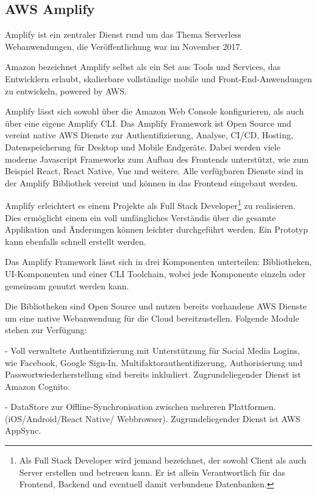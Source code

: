 
\subsection{AWS Amplify}

Amplify ist ein zentraler Dienst rund um das Thema Serverless Webanwendungen, die Veröffentlichung war im November 2017.

Amazon bezeichnet Amplify selbst als {}\glqq ein Set aus Tools und Services, das Entwicklern erlaubt, skalierbare vollständige
mobile und Front-End-Anwendungen zu entwickeln, powered by AWS.\grqq{}\cite[]{AWSAmplify}

Amplify lässt sich sowohl über die Amazon Web Console konfigurieren, als auch über eine eigene Amplify CLI.
Das Amplify Framework ist Open Source und vereint native AWS Dienste zur Authentifizierung, Analyse, CI/CD, Hosting, Datenspeicherung für Desktop und Mobile
Endgeräte. Dabei werden viele moderne Javascript Frameworks zum Aufbau des Frontends unterstützt, wie zum Beispiel React, React Native, Vue und weitere.
Alle verfügbaren Dienste sind in der Amplify Bibliothek vereint und können in das Frontend eingebaut werden.

Amplify erleichtert es einem Projekte als Full Stack Developer\footnote{Als Full Stack Developer wird jemand bezeichnet, der sowohl Client als auch Server
erstellen und betreuen kann. Er ist allein Verantwortlich für das Frontend, Backend und eventuell damit verbundene Datenbanken.} zu realisieren.
Dies ermöglicht einem ein voll umfängliches Verständis über die gesamte Applikation und Änderungen können leichter durchgeführt werden.
Ein Prototyp kann ebenfalls schnell erstellt werden.

Das Amplify Framework lässt sich in drei Komponenten unterteilen: Bibliotheken, UI-Komponenten und einer CLI Toolchain, wobei jede Komponente einzeln oder gemeinsam genutzt werden kann.

Die Bibliotheken sind Open Source und nutzen bereits vorhandene AWS Dienste um eine native Webanwendung für die Cloud bereitzustellen.
Folgende Module stehen zur Verfügung:

- Voll verwaltete Authentifizierung mit Unterstützung für Social Media Logins, wie Facebook, Google Sign-In. Multifaktorauthentifizerung, Authorisierung und Passwortwiederherstellung sind
bereits inkludiert. Zugrundeliegender Dienst ist Amazon Cognito.

- DataStore zur Offline-Synchronisation zwischen mehreren Plattformen. (iOS/Android/React Native/ Webbrowser). Zugrundeliegender Dienst ist AWS AppSync.

